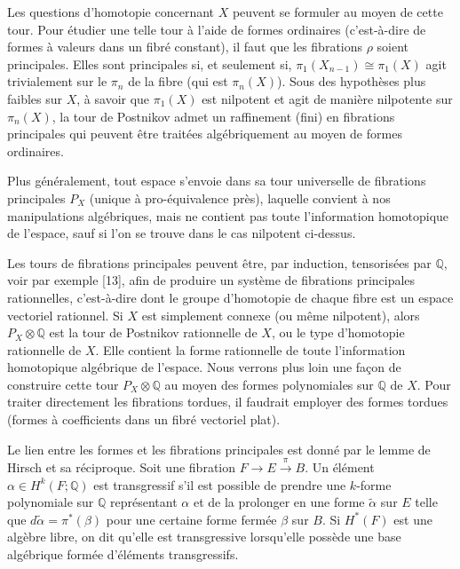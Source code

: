 \documentclass[
  french,
  a3paper,
  a3paper]{extarticle}
\begin{document}
\fontsize{9}{11}\selectfont

Les questions d'homotopie concernant \(X\) peuvent se formuler au moyen
de cette tour. Pour étudier une telle tour à l'aide de formes ordinaires
(c'est-à-dire de formes à valeurs dans un fibré constant), il faut que
les fibrations \(\rho\) soient principales. Elles sont principales si,
et seulement si, \(\pi_1(X_{n-1})\cong\pi_1(X)\) agit trivialement sur
le \(\pi_n\) de la fibre (qui est \(\pi_n(X)\)). Sous des hypothèses
plus faibles sur \(X\), à savoir que \(\pi_1(X)\) est nilpotent et agit
de manière nilpotente sur \(\pi_n(X)\), la tour de Postnikov admet un
raffinement (fini) en fibrations principales qui peuvent être traitées
algébriquement au moyen de formes ordinaires.

Plus généralement, tout espace s'envoie dans sa tour universelle de
fibrations principales \(P_X\) (unique à pro-équivalence près), laquelle
convient à nos manipulations algébriques, mais ne contient pas toute
l'information homotopique de l'espace, sauf si l'on se trouve dans le
cas nilpotent ci-dessus.

Les tours de fibrations principales peuvent être, par induction,
tensorisées par \(\mathbb Q\), voir par exemple {[}13{]}, afin de
produire un système de fibrations principales rationnelles, c'est-à-dire
dont le groupe d'homotopie de chaque fibre est un espace vectoriel
rationnel. Si \(X\) est simplement connexe (ou même nilpotent), alors
\(P_X\otimes\mathbb Q\) est la tour de Postnikov rationnelle de \(X\),
ou le type d'homotopie rationnelle de \(X\). Elle contient la forme
rationnelle de toute l'information homotopique algébrique de l'espace.
Nous verrons plus loin une façon de construire cette tour
\(P_X\otimes\mathbb Q\) au moyen des formes polynomiales sur
\(\mathbb Q\) de \(X\). Pour traiter directement les fibrations tordues,
il faudrait employer des formes tordues (formes à coefficients dans un
fibré vectoriel plat).

Le lien entre les formes et les fibrations principales est donné par le
lemme de Hirsch et sa réciproque. Soit une fibration
\(F\longrightarrow E\xrightarrow{\pi}B\). Un élément
\(\alpha\in H^k(F;\mathbb Q)\) est transgressif s'il est possible de
prendre une \(k\)-forme polynomiale sur \(\mathbb Q\) représentant
\(\alpha\) et de la prolonger en une forme \(\widetilde\alpha\) sur
\(E\) telle que \(d\widetilde\alpha=\pi^*(\beta)\) pour une certaine
forme fermée \(\beta\) sur \(B\). Si \(H^*(F)\) est une algèbre libre,
on dit qu'elle est transgressive lorsqu'elle possède une base algébrique
formée d'éléments transgressifs.
\end{document}
